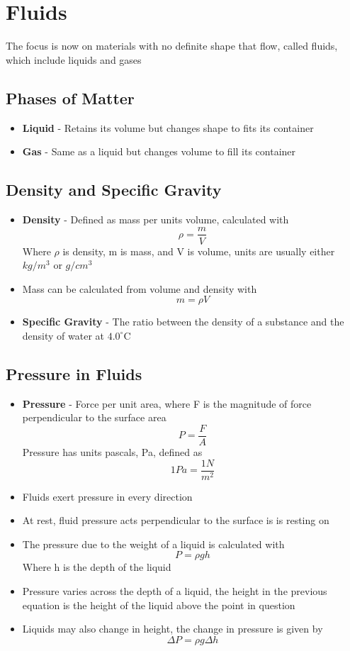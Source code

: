 \section{Fluids}
The focus is now on materials with no definite shape that flow, called fluids, which include liquids and gases

\subsection{Phases of Matter}
\begin{itemize}
    \item \textbf{Liquid} - Retains its volume but changes shape to fits its container
    \item \textbf{Gas} - Same as a liquid but changes volume to fill its container
\end{itemize}

\subsection{Density and Specific Gravity}
\begin{itemize}
    \item \textbf{Density} - Defined as mass per units volume, calculated with \[\rho=\frac{m}{V}\] Where \(\rho\) is density, m is mass, and V is volume, units are usually either \(kg/m^3\) or \(g/cm^3\)
    \item Mass can be calculated from volume and density with \[m=\rho V\]
    \item \textbf{Specific Gravity} - The ratio between the density of a substance and the density of water at \(4.0^\circ\)C
\end{itemize}

\subsection{Pressure in Fluids}
\begin{itemize}
    \item \textbf{Pressure} - Force per unit area, where F is the magnitude of force perpendicular to the surface area \[P=\frac{F}{A}\] Pressure has units pascals, Pa, defined as \[1Pa=\frac{1N}{m^2}\]
    \item Fluids exert pressure in every direction
    \item At rest, fluid pressure acts perpendicular to the surface is is resting on
    \item The pressure due to the weight of a liquid is calculated with \[P=\rho gh\] Where h is the depth of the liquid
    \item Pressure varies across the depth of a liquid, the height in the previous equation is the height of the liquid above the point in question
    \item Liquids may also change in height, the change in pressure is given by \[\Delta P=\rho g\Delta h\]
\end{itemize}

